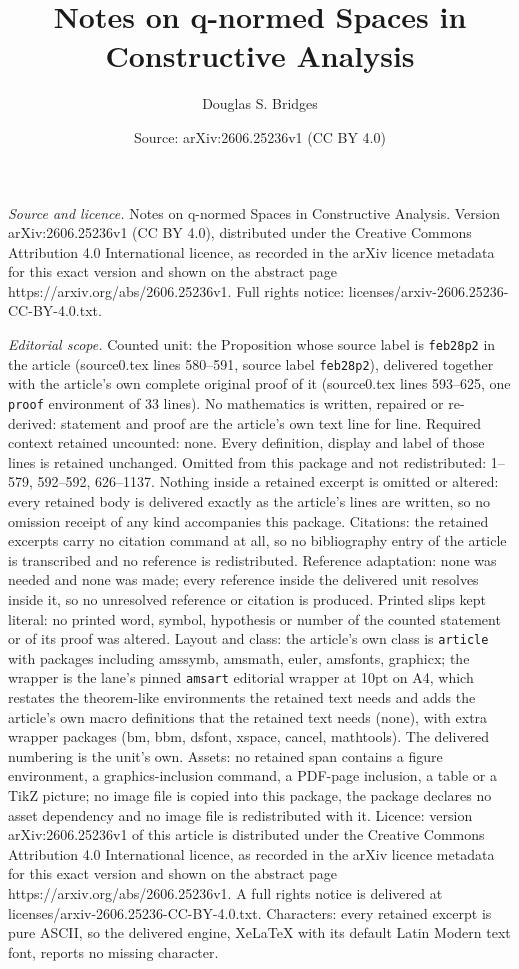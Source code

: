\documentclass[10pt,a4paper]{amsart}
\title[Notes on q-normed Spaces in Constructive Analysis]{Notes on q-normed Spaces in Constructive Analysis}
\author{Douglas S. Bridges}
\date{Source: arXiv:2606.25236v1 (CC BY 4.0)}
\begin{document}
\maketitle

\noindent\emph{Source and licence.} Notes on q-normed Spaces in Constructive Analysis. Version arXiv:2606.25236v1 (CC BY 4.0), distributed under the Creative Commons Attribution 4.0 International licence, as recorded in the arXiv licence metadata for this exact version and shown on the abstract page https://arxiv.org/abs/2606.25236v1. Full rights notice: licenses/arxiv-2606.25236-CC-BY-4.0.txt.\par\smallskip

\noindent\textit{Editorial scope.} Counted unit: the Proposition whose source label is \texttt{feb28p2} in the article (source0.tex lines 580--591, source label \texttt{feb28p2}), delivered together with the article's own complete original proof of it (source0.tex lines 593--625, one \texttt{proof} environment of 33 lines). No mathematics is written, repaired or re-derived: statement and proof are the article's own text line for line. Required context retained uncounted: none. Every definition, display and label of those lines is retained unchanged. Omitted from this package and not redistributed: 1--579, 592--592, 626--1137. Nothing inside a retained excerpt is omitted or altered: every retained body is delivered exactly as the article's lines are written, so no omission receipt of any kind accompanies this package. Citations: the retained excerpts carry no citation command at all, so no bibliography entry of the article is transcribed and no reference is redistributed. Reference adaptation: none was needed and none was made; every reference inside the delivered unit resolves inside it, so no unresolved reference or citation is produced. Printed slips kept literal: no printed word, symbol, hypothesis or number of the counted statement or of its proof was altered. Layout and class: the article's own class is \texttt{article} with packages including amssymb, amsmath, euler, amsfonts, graphicx; the wrapper is the lane's pinned \texttt{amsart} editorial wrapper at 10pt on A4, which restates the theorem-like environments the retained text needs and adds the article's own macro definitions that the retained text needs (none), with extra wrapper packages (bm, bbm, dsfont, xspace, cancel, mathtools). The delivered numbering is the unit's own. Assets: no retained span contains a figure environment, a graphics-inclusion command, a PDF-page inclusion, a table or a TikZ picture; no image file is copied into this package, the package declares no asset dependency and no image file is redistributed with it. Licence: version arXiv:2606.25236v1 of this article is distributed under the Creative Commons Attribution 4.0 International licence, as recorded in the arXiv licence metadata for this exact version and shown on the abstract page https://arxiv.org/abs/2606.25236v1. A full rights notice is delivered at licenses/arxiv-2606.25236-CC-BY-4.0.txt. Characters: every retained excerpt is pure ASCII, so the delivered engine, XeLaTeX with its default Latin Modern text font, reports no missing character.
\end{document}
